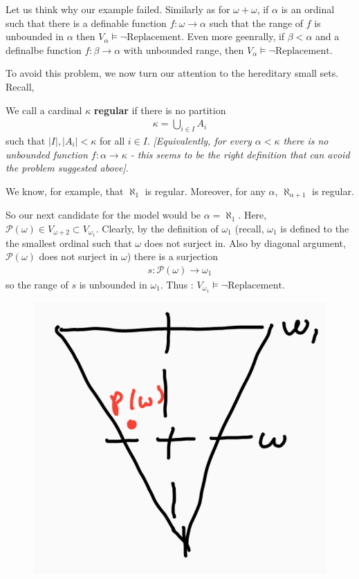\documentclass[12pt,a4paper]{article}
\begin{document}
\quad Let us think why our example failed. Similarly as for $\omega + \omega$, if $\alpha$ is an ordinal such that there is a definable function $f: \omega \rightarrow \alpha$ such that the range of $f$ is unbounded in $\alpha$ then $V_{\alpha} \models \neg \text{Replacement}$. Even more geenrally, if $\beta < \alpha$ and a definalbe function $f: \beta \rightarrow \alpha $ with unbounded range, then $V_{\alpha} \models \neg \text{Replacement}$.
\s

To avoid this problem, we now turn our attention to the hereditary small sets. Recall,

 We call a cardinal $\kappa$ \textbf{regular} if there is no partition
\begin{align*}
\kappa = \bigcup_{i\in I} A_i
\end{align*}
such that $|I|, |A_i| <\kappa$ for all $i\in I$. \emph{[Equivalently, for every $\alpha < \kappa$ there is no unbounded function $f: \alpha \rightarrow \kappa$ - this seems to be the right definition that can avoid the problem suggested above]}.

\quad We know, for example, that $\aleph_1$ is regular. Moreover, for any $\alpha$, $\aleph_{\alpha +1}$ is regular.
\s

\quad So our next candidate for the model would be $\alpha = \aleph_{1}$. Here, $\mathscr{P}(\omega) \in V_{\omega +2} \subset V_{\omega_1}$. Clearly, by the definition of $\omega_1$ (recall, $\omega_1$ is defined to the the smallest ordinal such that $\omega$ does not surject in. Also by diagonal argument, $\mathscr{P}(\omega)$ does not surject in $\omega$) there is a surjection
\begin{align*}
s: \mathscr{P}(\omega) \rightarrow \omega_1
\end{align*}
so the range of $s$ is unbounded in $\omega_1$. Thus : $V_{\omega_1} \models \neg \text{Replacement}$.

\begin{figure}[h]
\begin{center}
    \includegraphics[scale=0.25]{3}
\end{center}
\end{figure}
\end{document}
